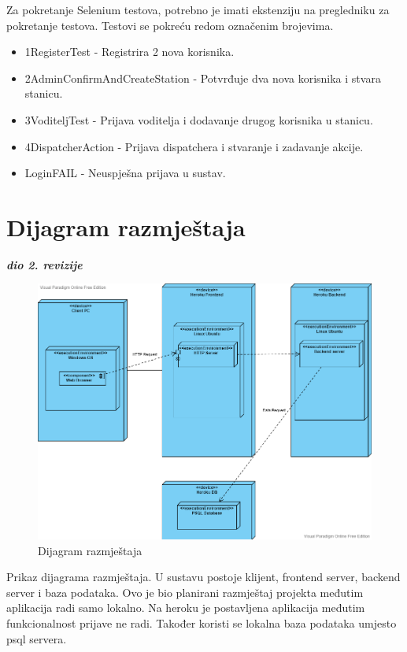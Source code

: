 			 Za pokretanje Selenium testova, potrebno je imati ekstenziju na pregledniku za pokretanje testova. Testovi se pokreću redom označenim brojevima.
			 \begin{itemize}
			 	\item 1RegisterTest - Registrira 2 nova korisnika.
			 	\item 2AdminConfirmAndCreateStation - Potvrđuje dva nova korisnika i stvara stanicu.
			 	\item 3VoditeljTest - Prijava voditelja i dodavanje drugog korisnika u stanicu.
			 	\item 4DispatcherAction - Prijava dispatchera i stvaranje i zadavanje akcije.
			 	\item LoginFAIL - Neuspješna prijava u sustav.
			 \end{itemize}

			
			\eject 
		
		
		\section{Dijagram razmještaja}
			
			\textbf{\textit{dio 2. revizije}}
			
			 \begin{figure}[H]
			 	\includegraphics[scale=0.45]{slike/razmjestaj.PNG}
			 	\centering
			 	\caption{Dijagram razmještaja}
			 	\label{fig:razmještaj}
			 \end{figure}
			Prikaz dijagrama razmještaja. U sustavu postoje klijent, frontend server, backend server i baza podataka. Ovo je bio planirani razmještaj projekta međutim aplikacija radi samo lokalno. Na heroku je postavljena aplikacija međutim funkcionalnost prijave ne radi. Također koristi se lokalna baza podataka umjesto psql servera.
			
